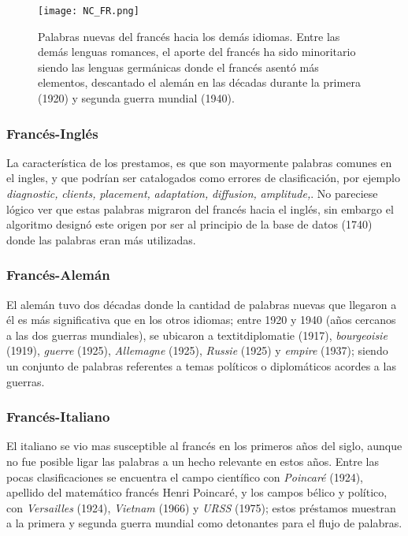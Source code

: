 \begin{figure}[h!]
	\centering
	\texttt{[image: NC\_FR.png]}
	\label{fig.NC_FR}
	\caption{Palabras nuevas del francés hacia los demás idiomas. Entre las demás lenguas romances, el aporte del francés ha sido minoritario siendo las lenguas germánicas donde el francés asentó más elementos, descantado el alemán en las décadas durante la primera (1920) y segunda guerra mundial (1940).}
	
	
\end{figure}

\subsubsection*{Francés-Inglés}%

La característica de los prestamos, es que son mayormente palabras  comunes en el ingles, y que podrían ser  catalogados como errores de clasificación, por ejemplo  \textit{diagnostic,} \textit{clients,} \textit{placement,} \textit{adaptation,} \textit{diffusion,} \textit{amplitude,}.  No pareciese lógico ver que estas palabras migraron del francés hacia el inglés, sin embargo el algoritmo designó este origen por ser al principio de la base de datos (1740)  donde las palabras eran más utilizadas.  



\subsubsection*{Francés-Alemán}%

El alemán tuvo dos décadas donde la cantidad de palabras nuevas que llegaron a él es más significativa que en los otros idiomas; entre 1920 y 1940  (años cercanos a las dos guerras mundiales), se ubicaron a  textit{diplomatie} (1917), \textit{bourgeoisie} (1919),  \textit{guerre} (1925), \textit{Allemagne} (1925), \textit{Russie} (1925) y \textit{empire} (1937); siendo un conjunto de palabras referentes a temas políticos  o diplomáticos acordes a las guerras. 


\subsubsection*{Francés-Italiano}%

El italiano se vio mas susceptible al francés en los primeros años del siglo, aunque no fue posible ligar  las palabras a un hecho relevante en estos años. Entre las pocas clasificaciones se encuentra el campo científico con \textit{Poincaré} (1924), apellido del matemático francés Henri Poincaré, y los campos bélico y político, con \textit{Versailles} (1924), \textit{Vietnam} (1966)  y \textit{URSS} (1975);  estos préstamos muestran a la primera y segunda guerra mundial como detonantes para el flujo de palabras.


